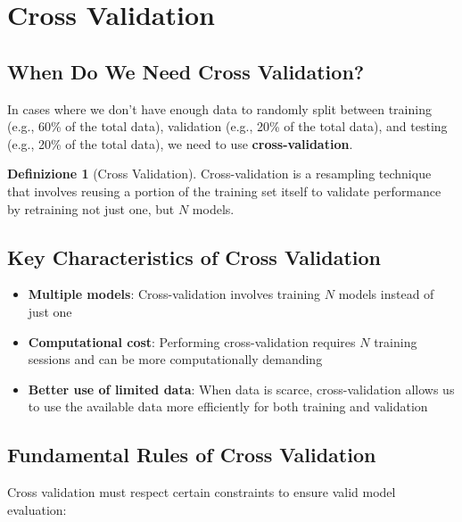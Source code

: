 \documentclass[11pt,a4paper]{article}
\theoremstyle{definition}
\newtheorem{definition}{Definizione}[section]
\theoremstyle{plain}
\theoremstyle{remark}
\begin{document}
\section{Cross Validation}

\subsection{When Do We Need Cross Validation?}

In cases where we don't have enough data to randomly split between training (e.g., 60\% of the total data), validation (e.g., 20\% of the total data), and testing (e.g., 20\% of the total data), we need to use \textbf{cross-validation}.

\begin{definition}[Cross Validation]
Cross-validation is a resampling technique that involves reusing a portion of the training set itself to validate performance by retraining not just one, but $N$ models.
\end{definition}

\subsection{Key Characteristics of Cross Validation}

\begin{itemize}
    \item \textbf{Multiple models}: Cross-validation involves training $N$ models instead of just one
    
    \item \textbf{Computational cost}: Performing cross-validation requires $N$ training sessions and can be more computationally demanding
    
    \item \textbf{Better use of limited data}: When data is scarce, cross-validation allows us to use the available data more efficiently for both training and validation
\end{itemize}

\subsection{Fundamental Rules of Cross Validation}

Cross validation must respect certain constraints to ensure valid model evaluation:
\end{document}
